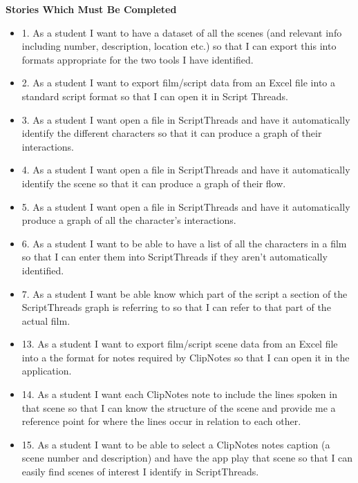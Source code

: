 \documentclass{article}
\begin{document}
\textbf{Stories Which Must Be Completed}
\begin{itemize}
    \item 1. As a student I want to have a dataset of all the scenes (and relevant info including number, description, location etc.) so that I can export this into formats appropriate for the two tools I have identified.
    \item 2. As a student I want to export film/script data from an Excel file into a standard script format so that I can open it in Script Threads.
    \item 3. As a student I want open a file in ScriptThreads and have it automatically identify the different characters so that it can produce a graph of their interactions.
    \item 4. As a student I want open a file in ScriptThreads and have it automatically identify the scene so that it can produce a graph of their flow.
    \item 5. As a student I want open a file in ScriptThreads and have it automatically produce a graph of all the character’s interactions.
    \item 6. As a student I want to be able to have a list of all the characters in a film so that I can enter them into ScriptThreads if they aren’t automatically identified.
    \item 7. As a student I want be able know which part of the script a section of the ScriptThreads graph is referring to so that I can refer to that part of the actual film.
    \item 13. As a student I want to export film/script scene data from an Excel file into a the format for notes required by ClipNotes so that I can open it in the application.
    \item 14. As a student I want each ClipNotes note to include the lines spoken in that scene so that I can know the structure of the scene and provide me a reference point for where the lines occur in relation to each other.
    \item 15. As a student I want to be able to select a ClipNotes notes caption (a scene number and description) and have the app play that scene so that I can easily find scenes of interest I identify in ScriptThreads.
\end{itemize}
\end{document}
